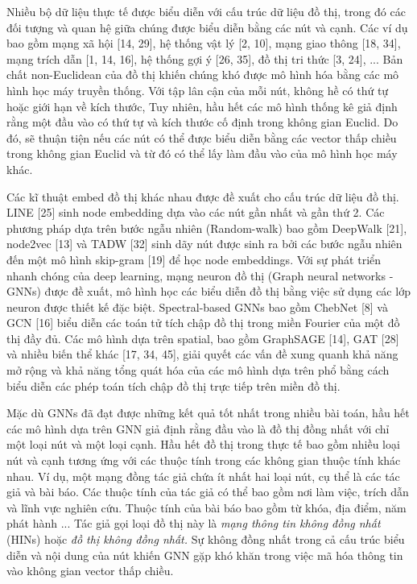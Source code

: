 Nhiều bộ dữ liệu thực tế được biểu diễn với cấu trúc dữ liệu đồ thị, trong đó các đối tượng và quan hệ giữa chúng được biểu diễn bằng các nút và cạnh. Các ví dụ bao gồm mạng xã hội [14, 29], hệ thống vật lý [2, 10], mạng giao thông [18, 34], mạng trích dẫn [1, 14, 16], hệ thống gợi ý [26, 35], đồ thị tri thức [3, 24], ... Bản chất non-Euclidean của đồ thị khiến chúng khó được mô hình hóa bằng các mô hình học máy truyền thống. Với tập lân cận của mỗi nút, không hề có thứ tự hoặc giới hạn về kích thước, Tuy nhiên, hầu hết các mô hình thống kê giả định rằng một đầu vào có thứ tự và kích thước cố định trong không gian Euclid. Do đó, sẽ thuận tiện nếu các nút có thể được biểu diễn bằng các vector thấp chiều trong không gian Euclid và từ đó có thể lấy làm đầu vào của mô hình học máy khác. 

Các kĩ thuật embed đồ thị khác nhau được đề xuất cho cấu trúc dữ liệu đồ thị. LINE [25] sinh node embedding dựa vào các nút gần nhất và gần thứ 2. Các phương pháp dựa trên bước ngẫu nhiên (Random-walk) bao gồm DeepWalk [21], node2vec [13] và TADW [32] sinh dãy nút được sinh ra bởi các bước ngẫu nhiên đến một mô hình skip-gram [19] để học node embeddings. Với sự phát triển nhanh chóng của deep learning, mạng neuron đồ thị (Graph neural networks - GNNs) được đề xuất, mô hình học các biểu diễn đồ thị bằng việc sử dụng các lớp neuron được thiết kế đặc biệt. Spectral-based GNNs bao gồm ChebNet [8] và GCN [16] biểu diễn các toán tử tích chập đồ thị trong miền Fourier của một đồ thị đầy đủ. Các mô hình dựa trên spatial, bao gồm GraphSAGE [14], GAT [28] và nhiều biến thể khác [17, 34, 45], giải quyết các vấn đề xung quanh khả năng mở rộng và khả năng tổng quát hóa của các mô hình dựa trên phổ bằng cách biểu diễn các phép toán tích chập đồ thị trực tiếp trên miền đồ thị. 

Mặc dù GNNs đã đạt được những kết quả tốt nhất trong nhiều bài toán, hầu hết các mô hình dựa trên GNN giả định rằng đầu vào là đồ thị đồng nhất với chỉ một loại nút và một loại cạnh. Hầu hết đồ thị trong thực tế bao gồm nhiều loại nút và cạnh tương ứng với các thuộc tính trong các không gian thuộc tính khác nhau. Ví dụ, một mạng đồng tác giả chứa ít nhất hai loại nút, cụ thể là các tác giả và bài báo. Các thuộc tính của tác giả có thể bao gồm nơi làm việc, trích dẫn và lĩnh vực nghiên cứu. Thuộc tính của bài báo bao gồm từ khóa, địa điểm, năm phát hành ... Tác giả gọi loại đồ thị này là \textit{mạng thông tin không đồng nhất} (HINs) hoặc \textit{đồ thị không đồng nhất.}
 Sự không đồng nhất trong cả cấu trúc biểu diễn và nội dung của nút khiến GNN gặp khó khăn trong việc mã hóa thông tin vào không gian vector thấp chiều. 


